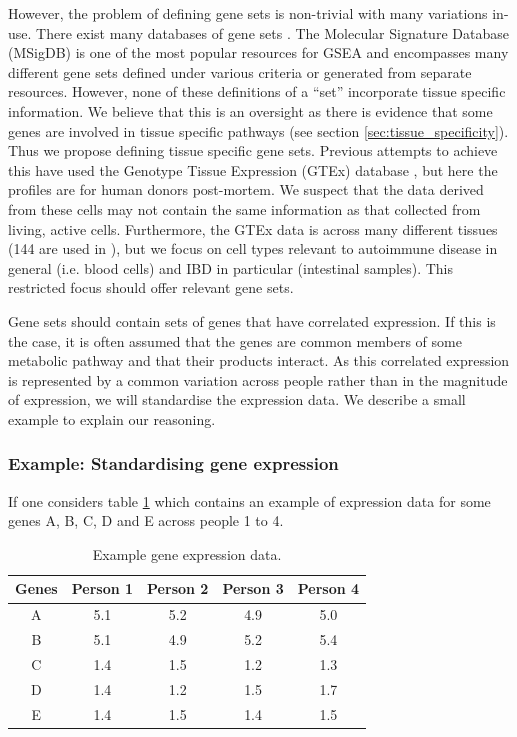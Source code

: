 \documentclass[12pt]{article} %
\begin{document}
	However, the problem of defining gene sets is non-trivial with many variations in-use. There exist many databases of gene sets \cite{AshburnerGeneOntologytool2000a}\cite{KanehisaNewapproachunderstanding2019}\cite{SzklarczykSTRINGv11protein2019}. The Molecular Signature Database \cite{SubramanianGenesetenrichment2005a} (MSigDB) is one of the most popular resources for GSEA and encompasses many different gene sets defined under various criteria or generated from separate resources. However, none of these definitions of a ``set'' incorporate tissue specific information. We believe that this is an oversight as there is evidence that some genes are involved in tissue specific pathways (see section \ref{sec:tissue_specificity}). Thus we propose defining tissue specific gene sets. Previous attempts to achieve this have used the Genotype Tissue Expression (GTEx) \cite{GTExConsortiumGeneticeffectsgene2017} database \cite{LonsdaleGenotypeTissueExpressionGTEx2013}, but here the profiles are for human donors
	post-mortem. We suspect that the data derived from these cells may not contain the same information as that collected from living, active cells. Furthermore, the GTEx data is across many different tissues (144 are used in \cite{LonsdaleGenotypeTissueExpressionGTEx2013}), but we focus on cell types relevant to autoimmune disease in general (i.e. blood cells) and IBD in particular (intestinal samples). This restricted focus should offer relevant gene sets.
	
	Gene sets should contain sets of genes that have correlated expression. If this is the case, it is often assumed that the genes are common members of some metabolic pathway and that their products interact. As this correlated expression is represented by a common variation across people rather than in the magnitude of expression, we will standardise the expression data. We describe a small example to explain our reasoning.
	
	\subsubsection{Example: Standardising gene expression}
	If one considers table \ref{table:example_gene_expression_data} which contains an example of expression data for some genes A, B, C, D and E across people 1 to 4.
	
	\begin{table}[] 
	\centering
	\begin{tabular}{c|cccc} 
	Genes 	& Person 1	& Person 2	& Person 3	& Person 4	\\ 
	\hline
	A 		& 5.1		& 5.2 		& 4.9		& 5.0		\\
	B 		& 5.1		& 4.9		& 5.2		& 5.4		\\
	C 		& 1.4		& 1.5		& 1.2		& 1.3		\\
	D 		& 1.4		& 1.2		& 1.5		& 1.7		\\
	E 		& 1.4		& 1.5		& 1.4		& 1.5		
	\end{tabular}
	\caption{Example gene expression data.}
	\label{table:example_gene_expression_data}
	\end{table}
	
\end{document}

